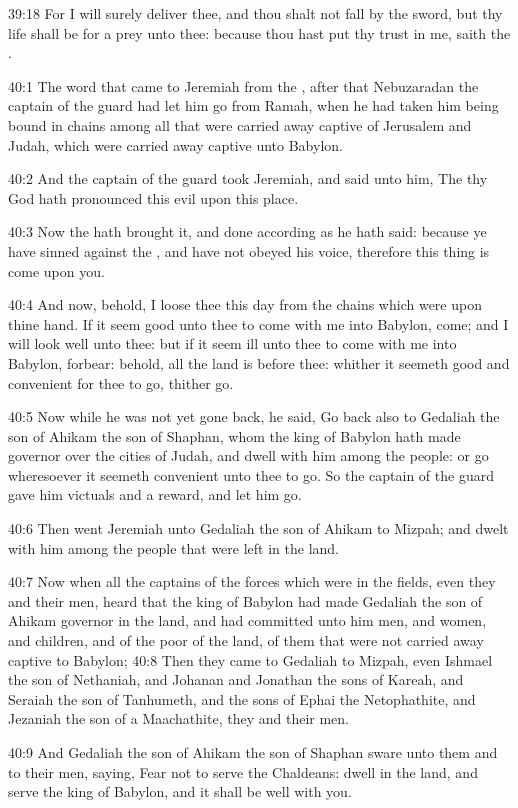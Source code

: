 39:18 For I will surely deliver thee, and thou shalt not fall by the sword, but thy life shall be for a prey unto thee: because thou hast put thy trust in me, saith the \LORD.

40:1 The word that came to Jeremiah from the \LORD, after that Nebuzaradan the captain of the guard had let him go from Ramah, when he had taken him being bound in chains among all that were carried away captive of Jerusalem and Judah, which were carried away captive unto Babylon.

40:2 And the captain of the guard took Jeremiah, and said unto him, The \LORD thy God hath pronounced this evil upon this place.

40:3 Now the \LORD hath brought it, and done according as he hath said: because ye have sinned against the \LORD, and have not obeyed his voice, therefore this thing is come upon you.

40:4 And now, behold, I loose thee this day from the chains which were upon thine hand. If it seem good unto thee to come with me into Babylon, come; and I will look well unto thee: but if it seem ill unto thee to come with me into Babylon, forbear: behold, all the land is before thee: whither it seemeth good and convenient for thee to go, thither go.

40:5 Now while he was not yet gone back, he said, Go back also to Gedaliah the son of Ahikam the son of Shaphan, whom the king of Babylon hath made governor over the cities of Judah, and dwell with him among the people: or go wheresoever it seemeth convenient unto thee to go. So the captain of the guard gave him victuals and a reward, and let him go.

40:6 Then went Jeremiah unto Gedaliah the son of Ahikam to Mizpah; and dwelt with him among the people that were left in the land.

40:7 Now when all the captains of the forces which were in the fields, even they and their men, heard that the king of Babylon had made Gedaliah the son of Ahikam governor in the land, and had committed unto him men, and women, and children, and of the poor of the land, of them that were not carried away captive to Babylon; 40:8 Then they came to Gedaliah to Mizpah, even Ishmael the son of Nethaniah, and Johanan and Jonathan the sons of Kareah, and Seraiah the son of Tanhumeth, and the sons of Ephai the Netophathite, and Jezaniah the son of a Maachathite, they and their men.

40:9 And Gedaliah the son of Ahikam the son of Shaphan sware unto them and to their men, saying, Fear not to serve the Chaldeans: dwell in the land, and serve the king of Babylon, and it shall be well with you.


